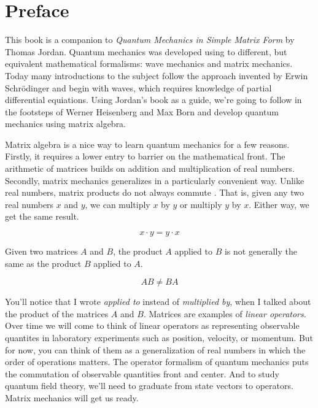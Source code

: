 \chapter{Preface}

This book is a companion to \emph{Quantum Mechanics in Simple Matrix Form} \cite{Jordan2005} by Thomas Jordan. Quantum mechanics was developed using to different, but equivalent mathematical formalisms: wave mechanics and matrix mechanics. Today many introductions to the subject follow the approach invented by Erwin Schr\"odinger and begin with waves, which requires knowledge of partial differential equiations. Using Jordan's book as a guide, we're going to follow in the footsteps of Werner Heisenberg and Max Born and develop quantum mechanics using matrix algebra.

Matrix algebra is a nice way to learn quantum mechanics for a few reasons. Firstly, it requires a lower entry to barrier on the mathematical front. The arithmetic of matrices builds on addition and multiplication of real numbers. Secondly, matrix mechanics generalizes in a particularly convenient way. Unlike real numbers, matrix products do not always commute . That is, given any two real numbers $x$ and $y$, we can multiply $x$ by $y$ or multiply $y$ by $x$. Either way, we get the same result.

$$ x\cdot y = y \cdot x $$

Given two matrices $A$ and $B$, the product $A$ applied to $B$ is not generally the same as the product $B$ applied to $A$.

$$ AB \neq BA $$

You'll notice that I wrote \emph{applied to} instead of \emph{multiplied by}, when I talked about the product of the matrices $A$ and $B$. Matrices are examples of \emph{linear operators}. Over time we will come to think of linear operators as representing observable quantites in laboratory experiments such as position, velocity, or momentum. But for now, you can think of them as a generalization of real numbers in which the order of operations matters. The operator formalism of quantum mechanics puts the commutation of observable quantities front and center. And to study quantum field theory, we'll need to graduate from state vectors to operators. Matrix mechanics will get us ready.

